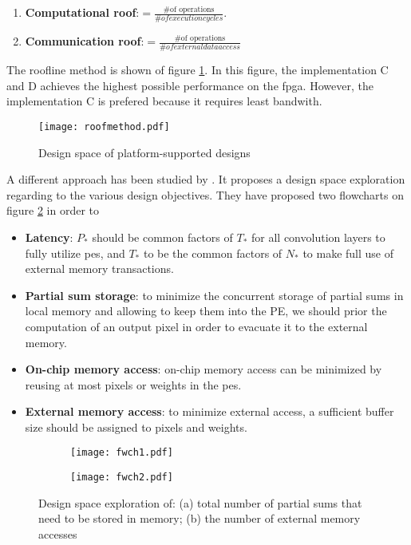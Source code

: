 \begin{enumerate}
    \item \textbf{Computational roof}:$= \frac{\text{\# of operations}}{\# of execution cycles}$.
    \item \textbf{Communication roof}:$= \frac{\text{\# of operations}}{\# of external data access}$
\end{enumerate}
The roofline method is shown of figure \ref{fig:roofmeth}. In this figure, the implementation C and D achieves the highest possible performance on the \acrshort{fpga}. However, the implementation C is prefered because it requires least bandwith.
%
\begin{figure}
    \centering
    \texttt{[image: roofmethod.pdf]}
    \label{fig:roofmeth}
    \caption{Design space of platform-supported designs  \cite{zhang_optimizing_2015}}
\end{figure} \newline \newline
%
A different approach has been studied by \cite{ma_optimizing_2018}. It proposes a design space exploration regarding to the various design objectives. They have proposed two flowcharts on figure \ref{fig:flowchart} in order to
\begin{itemize}
    \item \textbf{Latency}: $P_*$ should be common factors of  $T_*$ for all convolution layers to fully utilize \acrshort{pe}s, and $T_*$ to be the common factors of  $N_*$ to make full use of external memory transactions.
    \item \textbf{Partial sum storage}: to minimize the concurrent storage of partial sums in local memory and allowing to keep them into the PE, we should prior the computation of an output pixel in order to evacuate it to the external memory.
    \item \textbf{On-chip memory access}: on-chip memory access can be minimized by reusing at most pixels or weights in the \acrshort{pe}s.
    \item \textbf{External memory access}: to minimize external access, a sufficient buffer size should be assigned to pixels and weights.
\end{itemize}
%
\begin{figure}
\centering
    \begin{subfigure}{.45\textwidth}
    \centering
    \texttt{[image: fwch1.pdf]}
    \caption{ }
    \end{subfigure}
    \begin{subfigure}{.45\textwidth}
    \centering
    \texttt{[image: fwch2.pdf]}
    \caption{ }
    \end{subfigure}
    \label{fig:flowchart}
    \caption{Design space exploration of: (a) total number of partial sums that need to be stored in memory; (b) the number of external memory accesses \cite{ma_optimizing_2018}}
\end{figure}
